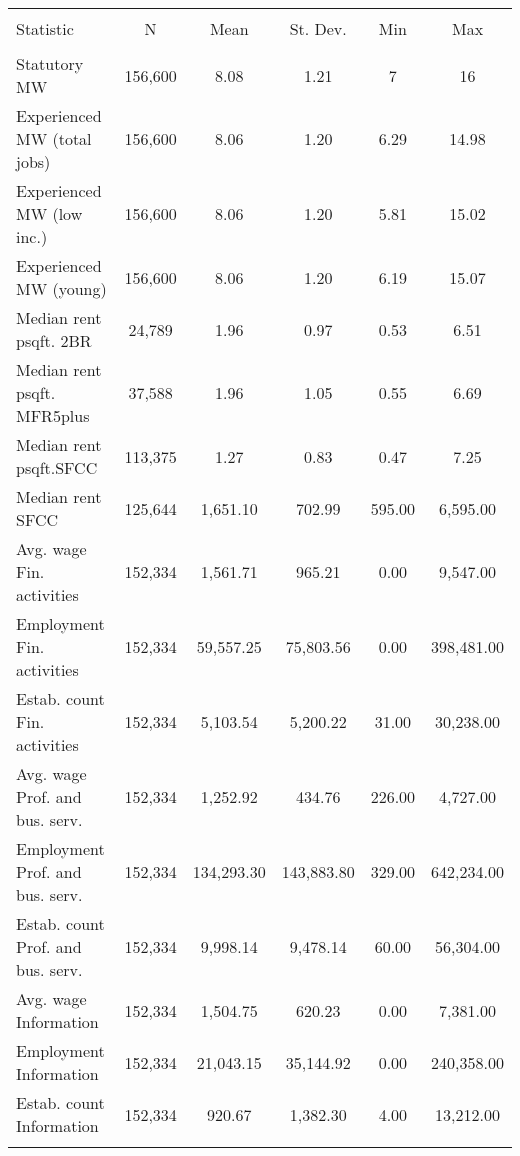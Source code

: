 
\begin{tabular}{@{\extracolsep{5pt}}lccccc} 
\\[-1.8ex]\hline 
\hline \\[-1.8ex] 
Statistic & \multicolumn{1}{c}{N} & \multicolumn{1}{c}{Mean} & \multicolumn{1}{c}{St. Dev.} & \multicolumn{1}{c}{Min} & \multicolumn{1}{c}{Max} \\ 
\hline \\[-1.8ex] 
Statutory MW & 156,600 & 8.08 & 1.21 & 7 & 16 \\ 
Experienced MW (total jobs) & 156,600 & 8.06 & 1.20 & 6.29 & 14.98 \\ 
Experienced MW (low inc.) & 156,600 & 8.06 & 1.20 & 5.81 & 15.02 \\ 
Experienced MW (young) & 156,600 & 8.06 & 1.20 & 6.19 & 15.07 \\ 
Median rent psqft. 2BR & 24,789 & 1.96 & 0.97 & 0.53 & 6.51 \\ 
Median rent psqft. MFR5plus & 37,588 & 1.96 & 1.05 & 0.55 & 6.69 \\ 
Median rent psqft.SFCC & 113,375 & 1.27 & 0.83 & 0.47 & 7.25 \\ 
Median rent SFCC & 125,644 & 1,651.10 & 702.99 & 595.00 & 6,595.00 \\ 
Avg. wage Fin. activities & 152,334 & 1,561.71 & 965.21 & 0.00 & 9,547.00 \\ 
Employment Fin. activities & 152,334 & 59,557.25 & 75,803.56 & 0.00 & 398,481.00 \\ 
Estab. count Fin. activities & 152,334 & 5,103.54 & 5,200.22 & 31.00 & 30,238.00 \\ 
Avg. wage Prof. and bus. serv. & 152,334 & 1,252.92 & 434.76 & 226.00 & 4,727.00 \\ 
Employment Prof. and bus. serv. & 152,334 & 134,293.30 & 143,883.80 & 329.00 & 642,234.00 \\ 
Estab. count Prof. and bus. serv. & 152,334 & 9,998.14 & 9,478.14 & 60.00 & 56,304.00 \\ 
Avg. wage Information & 152,334 & 1,504.75 & 620.23 & 0.00 & 7,381.00 \\ 
Employment Information & 152,334 & 21,043.15 & 35,144.92 & 0.00 & 240,358.00 \\ 
Estab. count Information & 152,334 & 920.67 & 1,382.30 & 4.00 & 13,212.00 \\ 
\hline \\[-1.8ex] 
\end{tabular} 
